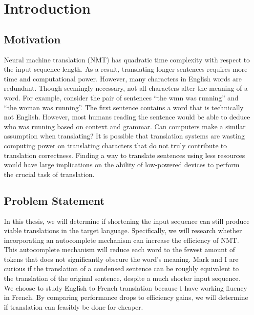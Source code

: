 \chapter{Introduction}

\section{Motivation}
Neural machine translation (NMT) has quadratic time complexity with respect to the input sequence length. As a result, translating longer sentences requires more time and computational power. However, many characters in English words are redundant. Though seemingly necessary, not all characters alter the meaning of a word. For example, consider the pair of sentences “the wmn was running” and “the woman was running”. The first sentence contains a word that is technically not English. However, most humans reading the sentence would be able to deduce who was running based on context and grammar. Can computers make a similar assumption when translating? It is possible that translation systems are wasting computing power on translating characters that do not truly contribute to translation correctness. Finding a way to translate sentences using less resources would have large implications on the ability of low-powered devices to perform the crucial task of translation.

\section{Problem Statement}
In this thesis, we will determine if shortening the input sequence can still produce viable translations in the target language. Specifically, we will research whether incorporating an autocomplete mechanism can increase the efficiency of NMT. This autocomplete mechanism will reduce each word to the fewest amount of tokens that does not significantly obscure the word’s meaning. Mark and I are curious if the translation of a condensed sentence can be roughly equivalent to the translation of the original sentence, despite a much shorter input sequence. We choose to study English to French translation because I have working fluency in French. By comparing performance drops to efficiency gains, we will determine if translation can feasibly be done for cheaper.  

